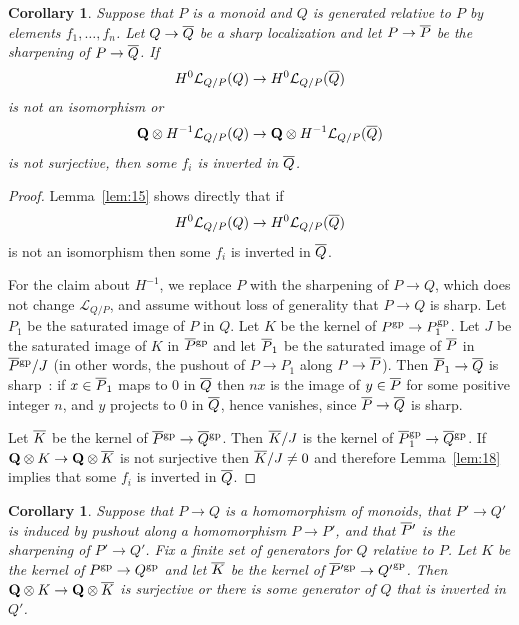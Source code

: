 \documentclass[10pt]{article}
\numberwithin{equation}{section}
\newtheorem{corollary}[paragraph]{Corollary}
\theoremstyle{definition}
\theoremstyle{remark}
\newcommand{\gp}[1]{#1^{\rm gp}}
\renewcommand{\bar}[1]{\overnorm{#1}\vphantom{#1}}
\def\overnorm#1{\overline{#1}\vphantom{#1}}
\begin{document}
\begin{corollary} \label{cor:8}
	Suppose that $P$ is a monoid and $Q$ is generated relative to $P$ by elements $f_1, \ldots, f_n$.  Let $Q \to \bar Q$ be a sharp localization and let $P \to \bar P$ be the sharpening of $P \to \bar Q$.  If
	\begin{equation*} 
			H^0 \mathcal L_{Q/P}(Q)  \to H^0 \mathcal L_{Q/P}(\bar Q) 
	\end{equation*}
	is not an isomorphism or
	\begin{equation*}
			\mathbf Q \otimes H^{-1} \mathcal L_{Q/P}(Q) \to \mathbf Q \otimes H^{-1} \mathcal L_{Q/P}(\bar Q)
	\end{equation*}
	is not surjective, then some $f_i$ is inverted in $\bar Q$.
\end{corollary}
\begin{proof}
	Lemma~\ref{lem:15} shows directly that if
	\begin{equation*}
		H^0 \mathcal L_{Q/P}(Q) \to H^0 \mathcal L_{Q/P}(\bar Q)
	\end{equation*}
	is not an isomorphism then some $f_i$ is inverted in $\bar Q$.  

	For the claim about $H^{-1}$, we replace $P$ with the sharpening of $P \to Q$, which does not change $\mathcal L_{Q/P}$, and assume without loss of generality that $P \to Q$ is sharp.  Let $P_1$ be the saturated image of $P$ in $Q$.  Let $K$ be the kernel of $P^{\rm gp} \to P_1^{\rm gp}$.  
	Let $J$ be the saturated image of $K$ in $\bar P^{\rm gp}$ and let $\bar P_1$ be the saturated image of $\bar P$ in $\bar P^{\rm gp} / J$ (in other words, the pushout of $P \to P_1$ along $P \to \bar P$).  Then $\bar P_1 \to \bar Q$ is sharp~: if $x \in \bar P_1$ maps to $0$ in $\bar Q$ then $nx$ is the image of $y \in \bar P$ for some positive integer $n$, and $y$ projects to $0$ in $\bar Q$, hence vanishes, since $\bar P \to \bar Q$ is sharp.

	Let $\bar K$ be the kernel of $\bar P^{\rm gp} \to \bar Q^{\rm gp}$.  Then $\bar K/J$ is the kernel of $\bar P_1^{\rm gp} \to \bar Q^{\rm gp}$.  If $\mathbf Q \otimes K \to \mathbf Q \otimes \bar K$ is not surjective then $\bar K/J \neq 0$ and therefore Lemma~\ref{lem:18} implies that some $f_i$ is inverted in $\bar Q$.
\end{proof}





\begin{corollary} \label{cor:1}
	Suppose that $P \to Q$ is a homomorphism of monoids, that $P' \to Q'$ is induced by pushout along a homomorphism $P \to P'$, and that $\bar P'$ is the sharpening of $P' \to Q'$.  Fix a finite set of generators for $Q$ relative to $P$.  Let $K$ be the kernel of $\gp P \to \gp Q$ and let $\bar K$ be the kernel of $\gp{\bar P'} \to {Q'}^{\rm gp}$.  Then $\mathbf Q \otimes K \to \mathbf Q \otimes \bar K$ is surjective or there is some generator of $Q$ that is inverted in $Q'$.
\end{corollary}
\end{document}
